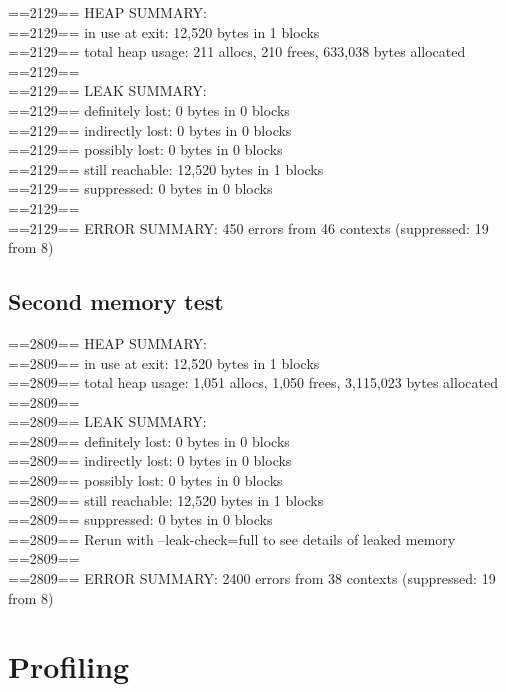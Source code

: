 \documentclass[11pt]{report}
\begin{document}
==2129== HEAP SUMMARY:\\
==2129==     in use at exit: 12,520 bytes in 1 blocks\\
==2129==   total heap usage: 211 allocs, 210 frees, 633,038 bytes allocated\\
==2129==\\
==2129== LEAK SUMMARY:\\
==2129==    definitely lost: 0 bytes in 0 blocks\\
==2129==    indirectly lost: 0 bytes in 0 blocks\\
==2129==      possibly lost: 0 bytes in 0 blocks\\
==2129==    still reachable: 12,520 bytes in 1 blocks\\
==2129==         suppressed: 0 bytes in 0 blocks\\
==2129==\\
==2129== ERROR SUMMARY: 450 errors from 46 contexts (suppressed: 19 from 8)\\

\section{Second memory test}

==2809== HEAP SUMMARY:\\
==2809==     in use at exit: 12,520 bytes in 1 blocks\\
==2809==   total heap usage: 1,051 allocs, 1,050 frees, 3,115,023 bytes allocated\\
==2809== \\
==2809== LEAK SUMMARY:\\
==2809==    definitely lost: 0 bytes in 0 blocks\\
==2809==    indirectly lost: 0 bytes in 0 blocks\\
==2809==      possibly lost: 0 bytes in 0 blocks\\
==2809==    still reachable: 12,520 bytes in 1 blocks\\
==2809==         suppressed: 0 bytes in 0 blocks\\
==2809== Rerun with --leak-check=full to see details of leaked memory\\
==2809== \\
==2809== ERROR SUMMARY: 2400 errors from 38 contexts (suppressed: 19 from 8)\\






\chapter*{Profiling}
\end{document}
